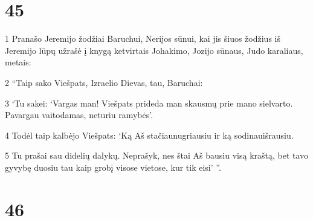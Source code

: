 \chapter{45}


\par 1 Pranašo Jeremijo žodžiai Baruchui, Nerijos sūnui, kai jis šiuos žodžius iš Jeremijo lūpų užrašė į knygą ketvirtais Johakimo, Jozijo sūnaus, Judo karaliaus, metais: 
\par 2 “Taip sako Viešpats, Izraelio Dievas, tau, Baruchai: 
\par 3 ‘Tu sakei: ‘Vargas man! Viešpats prideda man skausmų prie mano sielvarto. Pavargau vaitodamas, neturiu ramybės’. 
\par 4 Todėl taip kalbėjo Viešpats: ‘Ką Aš stačiau­nugriausiu ir ką sodinau­išrausiu. 
\par 5 Tu prašai sau didelių dalykų. Neprašyk, nes štai Aš bausiu visą kraštą, bet tavo gyvybę duosiu tau kaip grobį visose vietose, kur tik eisi’ ”.



\chapter{46}


